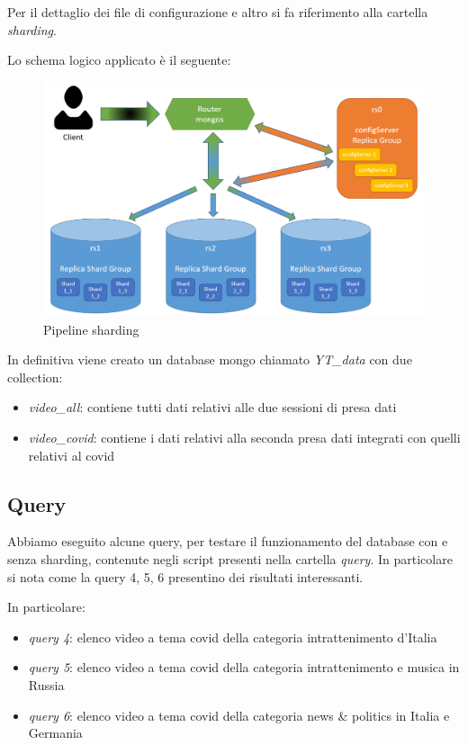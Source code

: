 \documentclass[10pt, a4paper,openany]{article}
\begin{document}
Per il dettaglio dei file di configurazione e altro si fa riferimento alla cartella \textit{sharding}.

Lo schema logico applicato è il seguente:
\begin{figure}[H]
	\centering
	\includegraphics[width=0.8\linewidth]{pics/sharding.png}
	\caption{Pipeline sharding}
\end{figure}

In definitiva viene creato un database mongo chiamato \textit{YT\_data} con due collection: 
\begin{itemize}
	\item \textit{video\_all}: contiene tutti dati relativi alle due sessioni di presa dati
	\item \textit{video\_covid}: contiene i dati relativi alla seconda presa dati integrati con quelli relativi al covid
\end{itemize}

\subsection*{Query}
	Abbiamo eseguito alcune query, per testare il funzionamento del database con e senza sharding, contenute negli script presenti nella cartella \textit{query}. In particolare si nota come la query 4, 5, 6 presentino dei risultati interessanti.
	
	In particolare:
	\begin{itemize}
		\item \textit{query 4}: elenco video a tema covid della categoria intrattenimento d'Italia
		\item \textit{query 5}: elenco video a tema covid della categoria intrattenimento e musica in Russia
		\item \textit{query 6}: elenco video a tema covid della categoria news \& politics in Italia e Germania
	\end{itemize}
	
\end{document}

